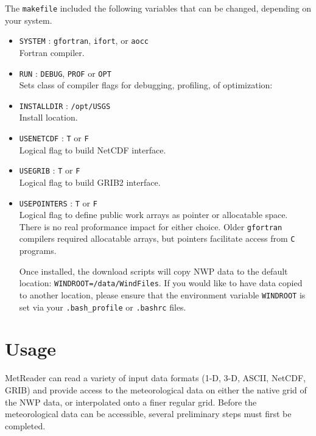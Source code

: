 \documentclass[11pt]{article}   %
\begin{document}
The \texttt{makefile} included the following variables that can be changed, depending on your
system.
\begin{itemize}
\item \texttt{SYSTEM} : \texttt{gfortran}, \texttt{ifort}, or \texttt{aocc}\\
Fortran compiler.
\item \texttt{RUN} : \texttt{DEBUG}, \texttt{PROF} or \texttt{OPT}\\
Sets class of compiler flags for debugging, profiling, of optimization:
\item \texttt{INSTALLDIR} : \texttt{/opt/USGS} \\
Install location.
\item \texttt{USENETCDF} : \texttt{T} or \texttt{F}\\
Logical flag to build NetCDF interface.
\item \texttt{USEGRIB} : \texttt{T} or \texttt{F}\\
Logical flag to build GRIB2 interface.
\item \texttt{USEPOINTERS} : \texttt{T} or \texttt{F}\\
Logical flag to define public work arrays as pointer or allocatable space. There is no
real proformance impact for either choice. Older \texttt{gfortran} compilers
required allocatable arrays, but pointers facilitate access from \texttt{C} programs.

Once installed, the download scripts will copy NWP data to the default location:
\texttt{WINDROOT=/data/WindFiles}.  If you would like to have data copied to another
location, please ensure that the environment variable \texttt{WINDROOT} is set via
your \texttt{.bash\_profile} or \texttt{.bashrc} files.
\end{itemize}

\clearpage
\section{Usage}
MetReader can read a variety of input data formats (1-D, 3-D, ASCII, NetCDF, GRIB) and
provide access to the meteorological data on either the native grid of the NWP data, or interpolated
onto a finer regular grid.  Before the meteorological data can be accessible, several preliminary steps
must first be completed.
\end{document}
